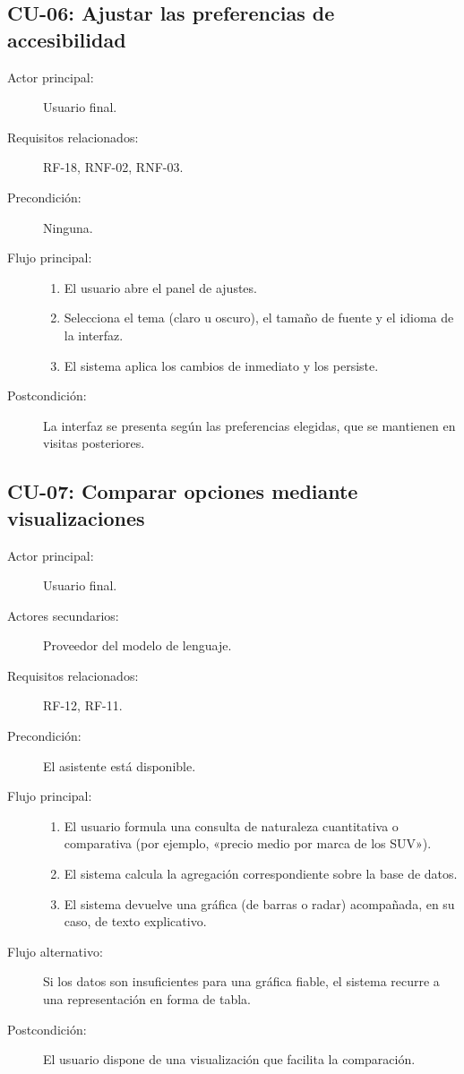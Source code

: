 \subsection{CU-06: Ajustar las preferencias de accesibilidad}

\begin{description}
  \item[Actor principal:] Usuario final.
  \item[Requisitos relacionados:] RF-18, RNF-02, RNF-03.
  \item[Precondición:] Ninguna.
  \item[Flujo principal:]
        \begin{enumerate}
          \item El usuario abre el panel de ajustes.
          \item Selecciona el tema (claro u oscuro), el tamaño de fuente y el
                idioma de la interfaz.
          \item El sistema aplica los cambios de inmediato y los persiste.
        \end{enumerate}
  \item[Postcondición:] La interfaz se presenta según las preferencias elegidas,
        que se mantienen en visitas posteriores.
\end{description}

\subsection{CU-07: Comparar opciones mediante visualizaciones}

\begin{description}
  \item[Actor principal:] Usuario final.
  \item[Actores secundarios:] Proveedor del modelo de lenguaje.
  \item[Requisitos relacionados:] RF-12, RF-11.
  \item[Precondición:] El asistente está disponible.
  \item[Flujo principal:]
        \begin{enumerate}
          \item El usuario formula una consulta de naturaleza cuantitativa o
                comparativa (por ejemplo, «precio medio por marca de los SUV»).
          \item El sistema calcula la agregación correspondiente sobre la base
                de datos.
          \item El sistema devuelve una gráfica (de barras o radar) acompañada,
                en su caso, de texto explicativo.
        \end{enumerate}
  \item[Flujo alternativo:] Si los datos son insuficientes para una gráfica
        fiable, el sistema recurre a una representación en forma de tabla.
  \item[Postcondición:] El usuario dispone de una visualización que facilita la
        comparación.
\end{description}

